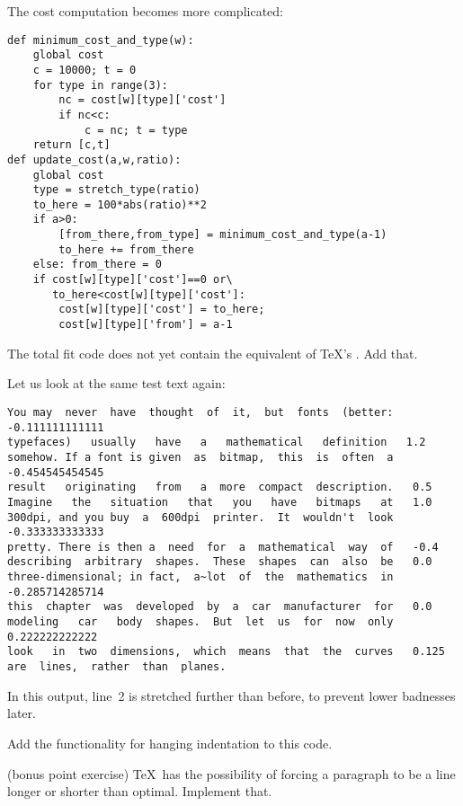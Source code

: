 The cost computation becomes more complicated:
\begin{verbatim}
def minimum_cost_and_type(w):
    global cost
    c = 10000; t = 0
    for type in range(3):
        nc = cost[w][type]['cost']
        if nc<c:
            c = nc; t = type
    return [c,t]
def update_cost(a,w,ratio):
    global cost
    type = stretch_type(ratio)
    to_here = 100*abs(ratio)**2
    if a>0:
        [from_there,from_type] = minimum_cost_and_type(a-1)
        to_here += from_there
    else: from_there = 0
    if cost[w][type]['cost']==0 or\
       to_here<cost[w][type]['cost']:
        cost[w][type]['cost'] = to_here;
        cost[w][type]['from'] = a-1
\end{verbatim}
\begin{594exercise}
The total fit code does not yet contain the equivalent of \TeX's
\cs{adjdemerits}. Add that.
\end{594exercise}

Let us look at the same test text again:
\begin{footnotesize}
\begin{verbatim}
You may  never  have  thought  of  it,  but  fonts  (better:   -0.111111111111
typefaces)   usually   have   a   mathematical   definition   1.2
somehow. If a font is given  as  bitmap,  this  is  often  a   -0.454545454545
result   originating   from   a  more  compact  description.   0.5
Imagine   the   situation   that   you   have   bitmaps   at   1.0
300dpi, and you buy  a  600dpi  printer.  It  wouldn't  look   -0.333333333333
pretty. There is then a  need  for  a  mathematical  way  of   -0.4
describing  arbitrary  shapes.  These  shapes  can  also  be   0.0
three-dimensional; in fact,  a~lot  of  the  mathematics  in   -0.285714285714
this  chapter  was  developed  by  a  car  manufacturer  for   0.0
modeling   car   body  shapes.  But  let  us  for  now  only   0.222222222222
look   in  two  dimensions,  which  means  that  the  curves   0.125
are  lines,  rather  than  planes.
\end{verbatim}
\end{footnotesize}
In this output, line~2 is stretched further than before, to prevent
lower badnesses later.

\begin{594exercise}
Add the functionality for hanging indentation to this code.
\end{594exercise}
\begin{594exercise}
(bonus point exercise)
\TeX\ has the possibility of forcing a paragraph to be a line longer
or shorter than optimal. Implement that.
\end{594exercise}

